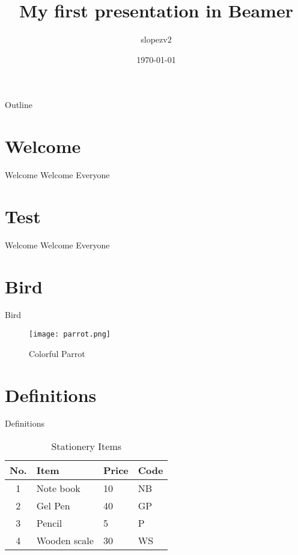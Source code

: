 \documentclass{beamer}
\title{My first presentation in Beamer}
\author{slopezv2}
\date{\today}
\begin{document}
	\begin{frame}
		\maketitle
	\end{frame}

	\begin{frame}{Outline}
		\tableofcontents
	\end{frame}

	\section{Welcome}
	\begin{frame}[t]{Welcome}
		Welcome Everyone
	\end{frame}

	\section{Test}
	\begin{frame}[t]{Welcome}
		Welcome Everyone
	\end{frame}

	\section{Bird}
	\begin{frame}{Bird}
		\begin{figure}
			\centering
			\texttt{[image: parrot.png]}
			\caption{Colorful Parrot}
		\end{figure}
	\end{frame}
	
	\section{Definitions}
	\begin{frame}{Definitions}
		\begin{table}
			\centering
			\begin{tabular}{clll}
				\hline
				No. & Item & Price & Code\\
				\hline
				1 & Note book & 10 & NB\\
				2 & Gel Pen & 40 & GP\\
				3 & Pencil & 5 & P\\
				4 & Wooden scale & 30 & WS\\
				\hline
			\end{tabular}
			\caption{Stationery Items}
		\end{table}
	\end{frame}
\end{document}
